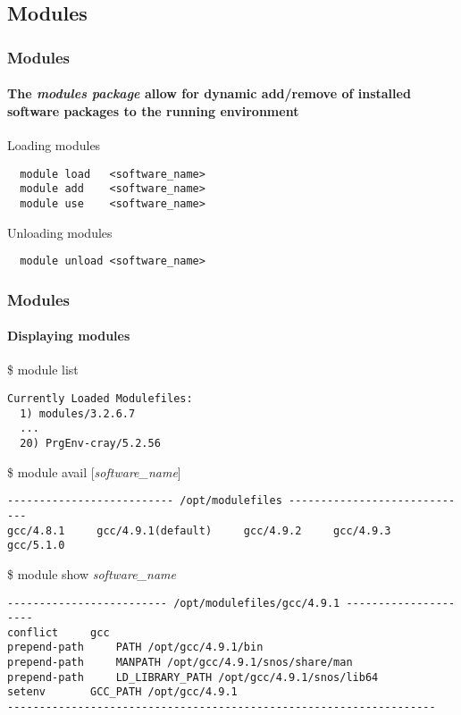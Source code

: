 \subsection{Modules}
\begin{frame}[fragile]
\frametitle{Modules}
\framesubtitle{The \textit{modules package} allow for dynamic add/remove of installed software packages to the running environment}

\begin{exampleblock}{Loading modules}
  \begin{verbatim}
  module load 	<software_name>
  module add 	<software_name>
  module use 	<software_name>
  \end{verbatim}
\end{exampleblock}

\begin{exampleblock}{Unloading modules}
  \begin{verbatim}
  module unload <software_name>
  \end{verbatim}
\end{exampleblock}
\end{frame}


\begin{frame}[fragile]
\frametitle{Modules }
\framesubtitle{Displaying modules}
\begin{exampleblock}{\$ module list}
\scriptsize
\begin{verbatim}
Currently Loaded Modulefiles:
  1) modules/3.2.6.7
  ...
  20) PrgEnv-cray/5.2.56
\end{verbatim}
\end{exampleblock}

\begin{exampleblock}{\$ module avail [\textit{software\_name}]}
\scriptsize
\begin{verbatim}
-------------------------- /opt/modulefiles -----------------------------
gcc/4.8.1     gcc/4.9.1(default)     gcc/4.9.2     gcc/4.9.3    gcc/5.1.0
\end{verbatim}
\end{exampleblock}

\begin{exampleblock}{\$ module show \textit{software\_name}}
\scriptsize
\begin{verbatim}
------------------------- /opt/modulefiles/gcc/4.9.1 ---------------------
conflict	 gcc 
prepend-path	 PATH /opt/gcc/4.9.1/bin 
prepend-path	 MANPATH /opt/gcc/4.9.1/snos/share/man 
prepend-path	 LD_LIBRARY_PATH /opt/gcc/4.9.1/snos/lib64 
setenv		 GCC_PATH /opt/gcc/4.9.1 
-------------------------------------------------------------------
\end{verbatim}
\end{exampleblock}
\end{frame}

